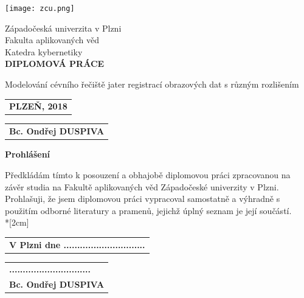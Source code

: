 \documentclass{thesis}%
\begin{document}
%
\begin{titlepage}
    \begin{center}
        \vspace*{0.6cm}
        

        
        \texttt{[image: zcu.png]}
        
        Západočeská univerzita v Plzni\\
        Fakulta aplikovaných věd\\       
        Katedra kybernetiky\\

        \vspace{4 cm}
     \textbf{DIPLOMOVÁ PRÁCE}
        
        \vspace{0.5cm}
        Modelování cévního řečiště jater registrací obrazových dat s různým rozlišením
        
        \vspace{6cm}
   \end{center}    

\begin{tabular}[t]{@{}l} 
 \textbf{PLZEŇ, 2018}
\end{tabular}
\hfill%
\begin{tabular}[t]{l@{}}
   \textbf{Bc. Ondřej DUSPIVA}
\end{tabular}
        
        \vfill
\end{titlepage}
\textbf{Prohlášení}

\vspace{0.6cm}

Předkládám tímto k posouzení a obhajobě diplomovou práci zpracovanou na závěr
studia na Fakultě aplikovaných věd Západočeské univerzity v Plzni.\\
Prohlašuji, že jsem diplomovou práci vypracoval samostatně a výhradně s použitím
odborné literatury a pramenů, jejichž úplný seznam je její součástí.\\*[2cm]

\begin{tabular}[t]{@{}l} 
 \textbf{V Plzni dne ..............................}
\end{tabular}
\hfill%
\begin{tabular}[t]{l@{}}
    \textbf{..............................}\\
   \textbf{Bc. Ondřej DUSPIVA}
\end{tabular}
\newpage 
\end{document}
